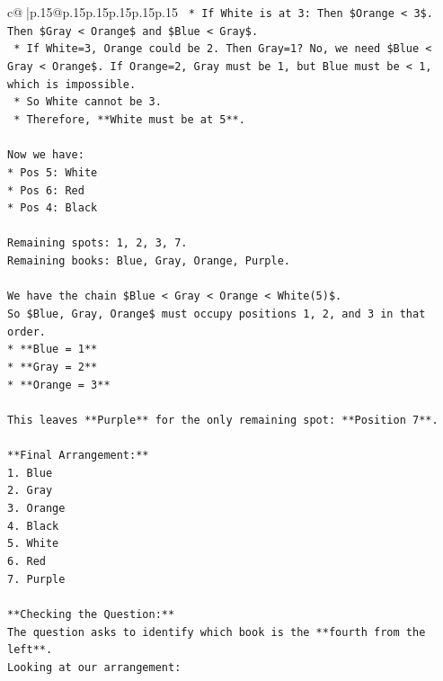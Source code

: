 \documentclass{article}
\begin{document}
{\begin{supertabular}{c@{$\;$}|p{.15\linewidth}@{}p{.15\linewidth}p{.15\linewidth}p{.15\linewidth}p{.15\linewidth}p{.15\linewidth}}
{{{\texttt{    *   If White is at 3: Then \$Orange < 3\$. Then \$Gray < Orange\$ and \$Blue < Gray\$.} \\
\texttt{        *   If White=3, Orange could be 2. Then Gray=1? No, we need \$Blue < Gray < Orange\$. If Orange=2, Gray must be 1, but Blue must be < 1, which is impossible.} \\
\texttt{        *   So White cannot be 3.} \\
\texttt{    *   Therefore, **White must be at 5**.} \\
\\ 
\texttt{Now we have:} \\
\texttt{*   Pos 5: White} \\
\texttt{*   Pos 6: Red} \\
\texttt{*   Pos 4: Black} \\
\\ 
\texttt{Remaining spots: 1, 2, 3, 7.} \\
\texttt{Remaining books: Blue, Gray, Orange, Purple.} \\
\\ 
\texttt{We have the chain \$Blue < Gray < Orange < White(5)\$.} \\
\texttt{So \$Blue, Gray, Orange\$ must occupy positions 1, 2, and 3 in that order.} \\
\texttt{*   **Blue = 1**} \\
\texttt{*   **Gray = 2**} \\
\texttt{*   **Orange = 3**} \\
\\ 
\texttt{This leaves **Purple** for the only remaining spot: **Position 7**.} \\
\\ 
\texttt{**Final Arrangement:**} \\
\texttt{1.  Blue} \\
\texttt{2.  Gray} \\
\texttt{3.  Orange} \\
\texttt{4.  Black} \\
\texttt{5.  White} \\
\texttt{6.  Red} \\
\texttt{7.  Purple} \\
\\ 
\texttt{**Checking the Question:**} \\
\texttt{The question asks to identify which book is the **fourth from the left**.} \\
\texttt{Looking at our arrangement:} \\
}}}
\end{supertabular}}
\end{document}
